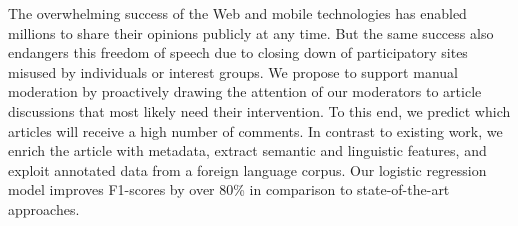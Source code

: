 The overwhelming success of the Web and mobile technologies has enabled millions to share their opinions publicly at any time. But the same success also endangers this freedom of speech due to closing down of participatory sites misused by individuals or interest groups. We propose to support manual moderation by proactively drawing the attention of our moderators to article discussions that most likely need their intervention. To this end, we predict which articles will receive a high number of comments. In contrast to existing work, we enrich the article with metadata, extract semantic and linguistic features, and exploit annotated data from a foreign language corpus. Our logistic regression model improves F1-scores by over 80\% in comparison to state-of-the-art approaches.
